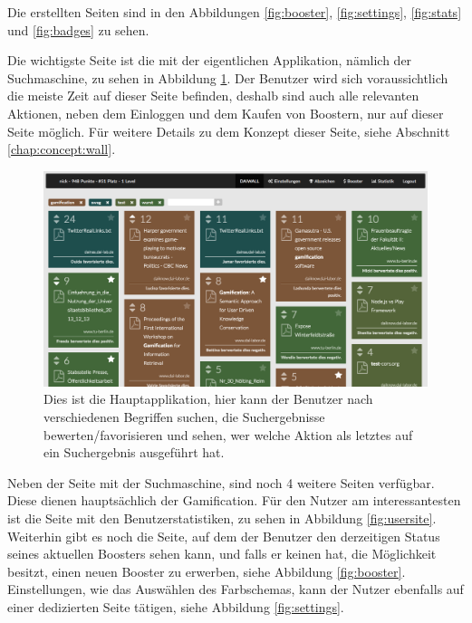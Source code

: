\documentclass[12pt,twoside]{book}
\begin{document}
Die erstellten Seiten sind in den Abbildungen \ref{fig:booster}, \ref{fig:settings}, \ref{fig:stats} und \ref{fig:badges} zu sehen.

Die wichtigste Seite ist die mit der eigentlichen Applikation, nämlich der Suchmaschine, zu sehen in Abbildung \ref{fig:wall}. Der Benutzer wird sich voraussichtlich die meiste Zeit auf dieser Seite befinden, deshalb sind auch alle relevanten Aktionen, neben dem Einloggen und dem Kaufen von Boostern, nur auf dieser Seite möglich. Für weitere Details zu dem Konzept dieser Seite, siehe Abschnitt \ref{chap:concept:wall}.

\begin{figure}[htbp]
    \centering
    \includegraphics[width=1.0\textwidth]{images/infoboard_wall.png}
    \caption{Dies ist die Hauptapplikation, hier kann der Benutzer nach verschiedenen Begriffen suchen, die Suchergebnisse bewerten/favorisieren und sehen, wer welche Aktion als letztes auf ein Suchergebnis ausgeführt hat.}\label{fig:wall}
\end{figure}

Neben der Seite mit der Suchmaschine, sind noch 4 weitere Seiten verfügbar. Diese dienen hauptsächlich der Gamification. Für den Nutzer am interessantesten ist die Seite mit den Benutzerstatistiken, zu sehen in Abbildung \ref{fig:usersite}.
Weiterhin gibt es noch die Seite, auf dem der Benutzer den derzeitigen Status seines aktuellen Boosters sehen kann, und falls er keinen hat, die Möglichkeit besitzt, einen neuen Booster zu erwerben, siehe Abbildung \ref{fig:booster}. Einstellungen, wie das Auswählen des Farbschemas, kann der Nutzer ebenfalls auf einer dedizierten Seite tätigen, siehe Abbildung \ref{fig:settings}.
\end{document}
